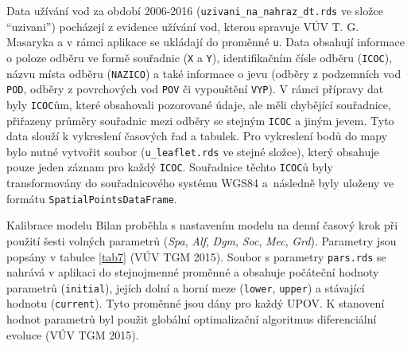 \documentclass[12pt,]{article}
\begin{document}
\qquad Data užívání vod za období 2006-2016
(\texttt{uzivani\_na\_nahraz\_dt.rds} ve složce \enquote{uzivani})
pocházejí z evidence užívání vod, kterou spravuje VÚV T. G. Masaryka a v
rámci aplikace se ukládají do proměnné \texttt{u}. Data obsahují
informace o poloze odběru ve formě souřadnic (\texttt{X} a \texttt{Y}),
identifikačním čísle odběru (\texttt{ICOC}), názvu místa odběru
(\texttt{NAZICO}) a také informace o jevu (odběry z podzemních vod
\texttt{POD}, odběry z povrchových vod \texttt{POV} či vypouštění
\texttt{VYP}). V rámci přípravy dat byly \texttt{ICOC}ům, které
obsahovali pozorované údaje, ale měli chybějící souřadnice, přiřazeny
průměry souřadnic mezi odběry se stejným \texttt{ICOC} a jiným jevem.
Tyto data slouží k vykreslení časových řad a tabulek. Pro vykreslení
bodů do mapy bylo nutné vytvořit soubor (\texttt{u\_leaflet.rds} ve
stejné složce), který obsahuje pouze jeden záznam pro každý
\texttt{ICOC}. Souřadnice těchto \texttt{ICOC}ů byly transformovány do
souřadnicového systému WGS84 a~následně byly uloženy ve formátu
\texttt{SpatialPointsDataFrame}.

\qquad Kalibrace modelu Bilan proběhla s nastavením modelu na denní
časový krok při použití šesti volných parametrů (\emph{Spa}, \emph{Alf},
\emph{Dgm}, \emph{Soc}, \emph{Mec}, \emph{Grd}). Parametry jsou popsány
v tabulce \ref{tab7} (VÚV TGM 2015). Soubor s parametry
\texttt{pars.rds} se nahrává v aplikaci do stejnojmenné proměnné a
obsahuje počáteční hodnoty parametrů (\texttt{initial}), jejích dolní a
horní meze (\texttt{lower}, \texttt{upper}) a stávající hodnotu
(\texttt{current}). Tyto proměnné jsou dány pro každý UPOV. K stanovení
hodnot parametrů byl použit globální optimalizační algoritmus
diferenciální evoluce (VÚV TGM 2015).
\end{document}
